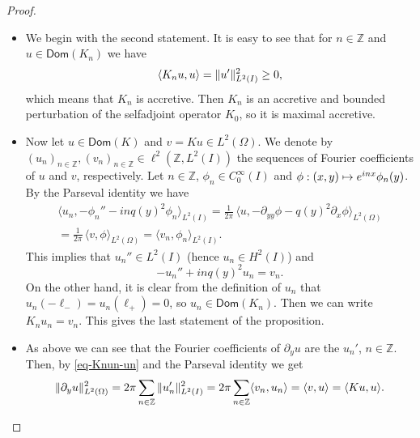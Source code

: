 \documentclass[JEP,XML,SOM,Unicode]{cedram}
\def\mto{\mathchoice{\longmapsto}{\mapsto}{\mapsto}{\mapsto}}
\theoremstyle{plain}
\theoremstyle{definition}
\newcommand{\nr}[1]{\Vert #1\Vert}
\newcommand{\binnp}[2]{\bigl\langle #1 , #2 \bigr\rangle}
\newcommand{\innps}[2]{\langle #1 , #2 \rangle}\let\innp\innps
\newcommand{\1}{\mathds 1}
\let\Re\relax
\DeclareMathOperator{\Re}{\mathsf{Re}\mkern2mu}
\newcommand{\Dom}{\mathsf{Dom}}
\newcommand{\Z}{\mathbb{Z}}
\let\vf\phi
\let\O\Omega
\begin{document}
\skpt
\begin{proof}
\begin{itemize}
\item
We begin with the second statement. It is easy to see that for $n \in \Z$ and $u \in \Dom(K_n)$ we have
\begin{equation} \label{eq-Knun-un}
\Re \innp{K_n u}{u} = \nr{u'}_{L^2(I)}^2 \geq 0,
\end{equation}
which means that $K_n$ is accretive. Then $K_n$ is an accretive and bounded perturbation of the selfadjoint operator $K_0$, so it is maximal accretive.

\item
Now let $u \in \Dom(K)$ and $v = Ku \in L^2(\O)$. We denote by $(u_n)_{n \in \Z}, (v_n)_{n \in \Z} \in \ell^2(\Z,L^2(I))$ the sequences of Fourier coefficients of $u$ and $v$, respectively. Let $n \in \Z$, $\vf_n \in C_0^\infty(I)$ and $\vf : (x,y) \mto e^{inx} \vf_n(y)$. By the Parseval identity we have
\begin{multline*}
\innp{u_n}{-\vf_n'' - in q(y)^2 \vf_n}_{L^2(I)}
= \frac 1 {2\pi}\, \binnp{u}{-\partial_{yy} \vf - q(y)^2 \partial_x \vf}_{L^2(\O)}\\
= \frac 1 {2\pi}\, \innp{v}{\vf}_{L^2(\O)} = \innp{v_n}{\vf_n}_{L^2(I)}.
\end{multline*}
This implies that $u_n'' \in L^2(I)$ (hence $u_n \in H^2(I)$) and
\[
-u_n'' + in q(y)^2 u_n = v_n.
\]
On the other hand, it is clear from the definition of $u_n$ that $u_n(-\ell_-) = u_n(\ell_+) = 0$, so $u_n \in \Dom(K_n)$. Then we can write $K_n u_n = v_n$. This gives the last statement of the proposition.

\item
As above we can see that the Fourier coefficients of $\partial_y u$ are the $u_n'$, $n \in \Z$. Then, by \eqref{eq-Knun-un} and the Parseval identity we get
\begin{equation} \label{eq-K-accretive}
\nr{\partial_y u }_{L^2(\O)}^2 = 2\pi \sum_{n \in \Z} \nr{u_n'}_{L^2(I)}^2 = 2\pi \Re \sum_{n \in \Z} \innp{v_n}{u_n} = \Re \innp{v}{u} = \Re \innps{Ku}{u}.
\end{equation}


\end{itemize}
\end{proof}
\end{document}
